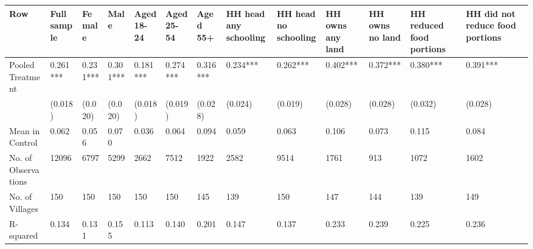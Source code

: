 
\begin{tabular}{lllllllllllll}
\toprule
Row & Full sample & Female & Male & Aged 18-24 & Aged 25-54 & Aged 55+ & HH head any schooling & HH head no schooling & HH owns any land & HH owns no land & HH reduced food portions & HH did not reduce food portions\\
\midrule
Pooled Treatment & 0.261*** & 0.231*** & 0.301*** & 0.181*** & 0.274*** & 0.316*** & 0.234*** & 0.262*** & 0.402*** & 0.372*** & 0.380*** & 0.391***\\
 & (0.018) & (0.020) & (0.020) & (0.018) & (0.019) & (0.028) & (0.024) & (0.019) & (0.028) & (0.028) & (0.032) & (0.028)\\
Mean in Control & 0.062 & 0.056 & 0.070 & 0.036 & 0.064 & 0.094 & 0.059 & 0.063 & 0.106 & 0.073 & 0.115 & 0.084\\
No. of Observations & 12096 & 6797 & 5299 & 2662 & 7512 & 1922 & 2582 & 9514 & 1761 & 913 & 1072 & 1602\\
No. of Villages & 150 & 150 & 150 & 150 & 150 & 145 & 139 & 150 & 147 & 144 & 139 & 149\\
\addlinespace
R-squared & 0.134 & 0.131 & 0.155 & 0.113 & 0.140 & 0.201 & 0.147 & 0.137 & 0.233 & 0.239 & 0.225 & 0.236\\
\bottomrule
\end{tabular}

